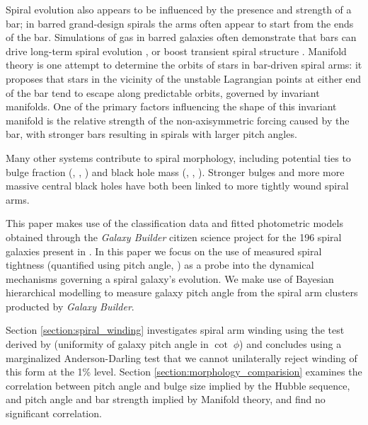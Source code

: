 Spiral evolution also appears to be influenced by the presence and strength of a bar; in barred grand-design spirals the arms often appear to start from the ends of the bar. Simulations of gas in barred galaxies often demonstrate that bars can drive long-term spiral evolution \citep{2008A&A...489..115R}, or boost transient spiral structure \citep{2012MNRAS.426..167G}. Manifold theory is one attempt to determine the orbits of stars in bar-driven spiral arms: it proposes that stars in the vicinity of the unstable Lagrangian points at either end of the bar tend to escape along predictable orbits, governed by invariant manifolds. One of the primary factors influencing the shape of this invariant manifold is the relative strength of the non-axisymmetric forcing caused by the bar, with stronger bars resulting in spirals with larger pitch angles.

Many other systems contribute to spiral morphology, including potential ties to bulge fraction (\citealt{1975A&A....44..363Y}, \citealt{2013MNRAS.436.1074S}, \citealt{2019MNRAS.487.1808M}) and black hole mass (\citealt{2008ApJ...678L..93S}, \citealt{2017MNRAS.471.2187D}, \citealt{2019MS&E..571a2118A}). Stronger bulges and more more massive central black holes have both been linked to more tightly wound spiral arms.

This paper makes use of the classification data and fitted photometric models obtained through the \textit{Galaxy Builder} citizen science project for the 196 spiral galaxies present in \Lingard. In this paper we focus on the use of measured spiral tightness (quantified using pitch angle, \citealt{1987gady.book.....B}) as a probe into the dynamical mechanisms governing a spiral galaxy's evolution. We make use of Bayesian hierarchical modelling to measure galaxy pitch angle from the spiral arm clusters producted by \textit{Galaxy Builder}.

Section \ref{section:spiral_winding} investigates spiral arm winding using the test derived by \cite{2019arXiv190910291P} (uniformity of galaxy pitch angle in $\cot\;\phi$) and concludes using a marginalized Anderson-Darling test that we cannot unilaterally reject winding of this form at the 1\% level. Section \ref{section:morphology_comparision} examines the correlation between pitch angle and bulge size implied by the Hubble sequence, and pitch angle and bar strength implied by Manifold theory, and find no significant correlation.
